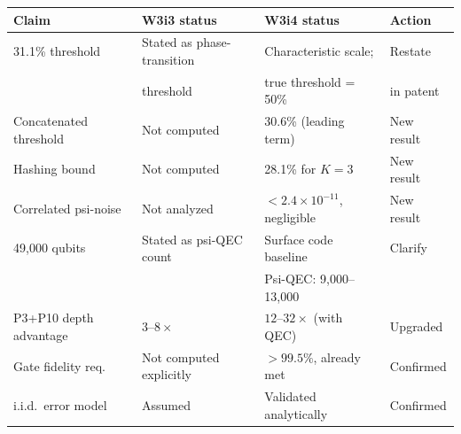 \documentclass[11pt]{article}
\theoremstyle{definition}
\theoremstyle{remark}
\begin{document}
\begin{center}
\begin{tabular}{llll}
\toprule
Claim & W3i3 status & W3i4 status & Action \\
\midrule
31.1\% threshold & Stated as phase-transition & Characteristic scale; & Restate \\
  & threshold & true threshold = 50\% & in patent \\
Concatenated threshold & Not computed & 30.6\% (leading term) & New result \\
Hashing bound & Not computed & 28.1\% for $K=3$ & New result \\
Correlated psi-noise & Not analyzed & $< 2.4\times10^{-11}$, negligible & New result \\
49,000 qubits & Stated as psi-QEC count & Surface code baseline & Clarify \\
  &  & Psi-QEC: 9,000--13,000 & \\
P3+P10 depth advantage & $3\text{--}8\times$ & $12\text{--}32\times$ (with QEC) & Upgraded \\
Gate fidelity req. & Not computed explicitly & $> 99.5\%$, already met & Confirmed \\
i.i.d.\ error model & Assumed & Validated analytically & Confirmed \\
\bottomrule
\end{tabular}
\end{center}
\end{document}

